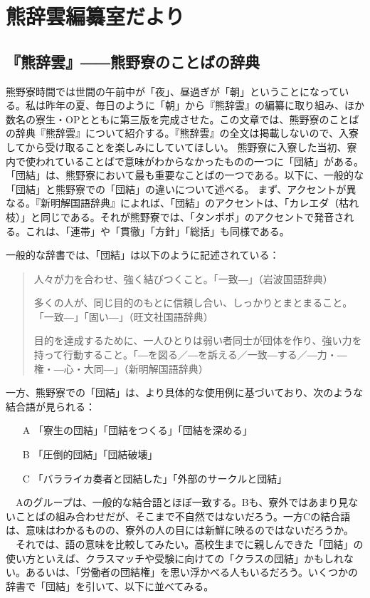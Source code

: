 \section{ 熊辞雲編纂室だより}
\author{仏子}

\subsection{『熊辞雲』――熊野寮のことばの辞典}

熊野寮時間では世間の午前中が「夜」、昼過ぎが「朝」ということになっている。私は昨年の夏、毎日のように「朝」から『熊辞雲』の編纂に取り組み、ほか数名の寮生・OPとともに第三版を完成させた。この文章では、熊野寮のことばの辞典『熊辞雲』について紹介する。『熊辞雲』の全文は掲載しないので、入寮してから受け取ることを楽しみにしていてほしい。
熊野寮に入寮した当初、寮内で使われていることばで意味がわからなかったものの一つに「団結」がある。「団結」は、熊野寮において最も重要なことばの一つである。以下に、一般的な「団結」と熊野寮での「団結」の違いについて述べる。
まず、アクセントが異なる。『新明解国語辞典』によれば、「団結」のアクセントは、「カレエダ（枯れ枝）」と同じである。それが熊野寮では、「タンポポ」のアクセントで発音される。これは、「連帯」や「貫徹」「方針」「総括」も同様である。

一般的な辞書では、「団結」は以下のように記述されている：
\begin{quote}
人々が力を合わせ、強く結びつくこと。「一致―」（岩波国語辞典）

多くの人が、同じ目的のもとに信頼し合い、しっかりとまとまること。「一致―」「固い―」（旺文社国語辞典）

目的を達成するために、一人ひとりは弱い者同士が団体を作り、強い力を持って行動すること。「―を図る／―を訴える／一致―する／―力・―権・―心・大同―」（新明解国語辞典）
\end{quote}

一方、熊野寮での「団結」は、より具体的な使用例に基づいており、次のような結合語が見られる：
\begin{itemize}
    \item[A] 「寮生の団結」「団結をつくる」「団結を深める」
    \item[B] 「圧倒的団結」「団結破壊」
    \item[C] 「バラライカ奏者と団結した」「外部のサークルと団結」
\end{itemize}

　Aのグループは、一般的な結合語とほぼ一致する。Bも、寮外ではあまり見ないことばの組み合わせだが、そこまで不自然ではないだろう。一方Cの結合語は、意味はわかるものの、寮外の人の目には新鮮に映るのではないだろうか。
　それでは、語の意味を比較してみたい。高校生までに親しんできた「団結」の使い方といえば、クラスマッチや受験に向けての「クラスの団結」かもしれない。あるいは、「労働者の団結権」を思い浮かべる人もいるだろう。いくつかの辞書で「団結」を引いて、以下に並べてみる。

